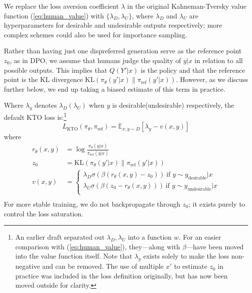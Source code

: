 We replace the loss aversion coefficient $\lambda$ in the original Kahneman-Tversky value function (\ref{eq:human_value}) with $\{\lambda_D, \lambda_U\}$, where $\lambda_D$ and $\lambda_U$ are hyperparameters for desirable and undesirable outputs respectively; more complex schemes could also be used for importance sampling.

Rather than having just one dispreferred generation serve as the reference point $z_0$, as in DPO, we assume that humans judge the quality of $y|x$ in relation to all possible outputs.
This implies that $Q(Y'|x)$ is the policy and that the reference point is the KL divergence $\text{KL}(\pi_{\theta}(y'|x)\|\pi_\text{ref}(y'|x))$.
However, as we discuss further below, we end up taking a biased estimate of this term in practice.

Where $\lambda_y$ denotes $\lambda_D(\lambda_U)$ when $y$ is desirable(undesirable) respectively, the default KTO loss is:\footnote{An earlier draft separated out $\lambda_D, \lambda_U$ into a function $w$. For an easier comparison with (\ref{eq:human_value}), they---along with $\beta$---have been moved into the value function itself. Note that $\lambda_y$ exists solely to make the loss non-negative and can be removed. The use of multiple $x'$ to estimate $z_0$ in practice was included in the loss definition originally, but has now been moved outside for clarity.}
\begin{equation}
    L_\text{KTO}(\pi_\theta, \pi_\text{ref}) = 
     \mathbb{E}_{x,y \sim D} [ \lambda_y - v(x, y) ]
    \label{eq:kto_loss}
\end{equation}
where 
\begin{equation*}
\begin{split}
    r_\theta(x, y) &= \log \frac{\pi_\theta(y|x)}{\pi_\text{ref}(y|x)} \\
    z_0 &= \text{KL}(\pi_{\theta}(y'|x)\|\pi_\text{ref}(y'|x)) \\
    v(x, y) &=
    \begin{cases}
    \lambda_D \sigma(\beta(r_\theta(x,y) - z_0)) \ \text{if } y \sim y_\text{desirable}|x \\
    \lambda_U \sigma(\beta(z_0 - r_\theta(x,y))) \ \text{if } y \sim y_\text{undesirable}|x\\
    \end{cases} \\
\end{split}
\end{equation*}
For more stable training, we do not backpropagate through $z_0$; it exists purely to control the loss saturation.

